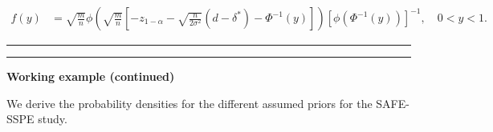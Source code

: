 \documentclass[
]{book}
\begin{document}
\[
\begin{aligned}
f(y)&=\sqrt{\frac{m}{n}}\phi\left(\sqrt{\frac{m}{n}}\left[-z_{1-\alpha}-\sqrt{\frac{n}{2\sigma^2}}(d-\delta^*)-\Phi^{-1}(y)\right] \right)\left[ \phi\left(\Phi^{-1}(y) \right) \right]^{-1}, \quad 0<y<1.
\end{aligned}
\]

\begin{center}\rule{0.5\linewidth}{0.5pt}\end{center}

\begin{center}\rule{0.5\linewidth}{0.5pt}\end{center}

\textbf{Working example (continued) }

We derive the probability densities for the different assumed priors for the SAFE-SSPE study.
\end{document}
